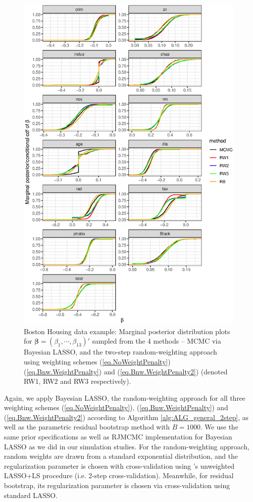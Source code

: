 \documentclass[ejs,authoryear,linksfromyear]{imsart}
\numberwithin{equation}{section}
\theoremstyle{plain}
\begin{document}
\begin{figure}[!]
	\centering
	\includegraphics[scale=0.72]{boston_beta_cdf}
	\caption{Boston Housing data example: Marginal posterior distribution plots for $\bm{\beta} = (\beta_1, \cdots, \beta_{13})'$ sampled from the 4 methods -- MCMC via Bayesian LASSO, and the two-step random-weighting approach using weighting schemes (\ref{eq.NoWeightPenalty}) (\ref{eq.Bnw.WeightPenalty}) and (\ref{eq.Bnw.WeightPenalty2}) (denoted RW1, RW2 and RW3 respectively).}
	\label{fig:boston_beta_cdf}
\end{figure}

Again, we apply Bayesian LASSO, the random-weighting approach for all three weighting schemes (\ref{eq.NoWeightPenalty}), (\ref{eq.Bnw.WeightPenalty}) and (\ref{eq.Bnw.WeightPenalty2}) according to Algorithm \ref{alg:ALG_general_2step}, as well as the parametric residual bootstrap method \citep{Knight&Fu} with $B=1000$.  We use the same prior specifications as well as RJMCMC implementation for Bayesian LASSO as we did in our simulation studies. For the random-weighting approach, random weights are drawn from a standard exponential distribution, and the regularization parameter is chosen with cross-validation using \citet{Liu&Yu}'s unweighted LASSO+LS procedure (i.e. 2-step cross-validation). Meanwhile, for residual bootstrap, its regularization parameter is chosen via cross-validation using standard LASSO. 
\end{document}
